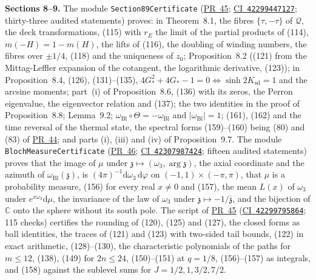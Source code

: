 \documentclass[11pt,a4paper]{article}
\newcommand{\R}{https://github.com/ralfanop/Certifications_Eulerian_polar-curve_computations}
\newcommand{\PR}[1]{\href{\R/pull/#1}{PR~#1}}
\newcommand{\CI}[1]{\href{\R/actions/runs/#1}{CI~\texttt{#1}}}
\newcommand{\eq}[1]{(#1)}
\newcommand{\rE}{r_E}
\begin{document}
\textbf{Sections 8--9.} The module \texttt{Section89Certificate} (\PR{45}; \CI{42299447127}; thirty-three audited statements) proves: in Theorem~8.1, the fibres $\{\tau,-\tau\}$ of $\mathcal Q$, the deck transformations, \eq{115} with $\rE$ the limit of the partial products of \eq{114}, $m(-H)=1-m(H)$, the lifts of \eq{116}, the doubling of winding numbers, the fibres over $\pm1/4$, \eq{118} and the uniqueness of $z_0$; Proposition~8.2 (\eq{121} from the Mittag-Leffler expansion of the cotangent, the logarithmic derivative, \eq{123}); in Proposition~8.4, \eq{126}, \eq{131}--\eq{135}, $4G_*^2+4G_*-1=0\Leftrightarrow\sinh2K_{\mathrm{sd}}=1$ and the arcsine moments; part~(i) of Proposition~8.6, \eq{136} with its zeros, the Perron eigenvalue, the eigenvector relation and \eq{137}; the two identities in the proof of Proposition~8.8; Lemma~9.2; $\omega_{\mathrm{Bl}}\circ\Theta=-\omega_{\mathrm{Bl}}$ and $|\omega_{\mathrm{Bl}}|=1$; \eq{161}, \eq{162} and the time reversal of the thermal state, the spectral forms \eq{159}--\eq{160} being \eq{80} and \eq{83} of \PR{44}; and parts (i), (iii) and (iv) of Proposition~9.7. The module \texttt{BlochMeasureCertificate} (\PR{46}; \CI{42307987424}; fifteen audited statements) proves that the image of $\mu$ under $\mathfrak z\mapsto(\omega_3,\arg\mathfrak z)$, the axial coordinate and the azimuth of $\omega_{\mathrm{Bl}}(\mathfrak z)$, is $(4\pi)^{-1}\mathrm d\omega_3\,\mathrm d\varphi$ on $(-1,1)\times(-\pi,\pi)$, that $\mu$ is a probability measure, \eq{156} for every real $x\neq0$ and \eq{157}, the mean $L(x)$ of $\omega_3$ under $e^{x\omega_3}\mathrm d\mu$, the invariance of the law of $\omega_3$ under $\mathfrak z\mapsto-1/\overline{\mathfrak z}$, and the bijection of $\mathbb C$ onto the sphere without its south pole. The script of \PR{45} (\CI{42299795864}; 115 checks) certifies the rounding of \eq{120}, \eq{125} and \eq{127}, the closed forms as ball identities, the traces of \eq{121} and \eq{123} with two-sided tail bounds, \eq{122} in exact arithmetic, \eq{128}--\eq{130}, the characteristic polynomials of the paths for $m\leq12$, \eq{138}, \eq{149} for $2n\leq24$, \eq{150}--\eq{151} at $q=1/8$, \eq{156}--\eq{157} as integrals, and \eq{158} against the sublevel sums for $J=1/2,1,3/2,7/2$.
\end{document}
